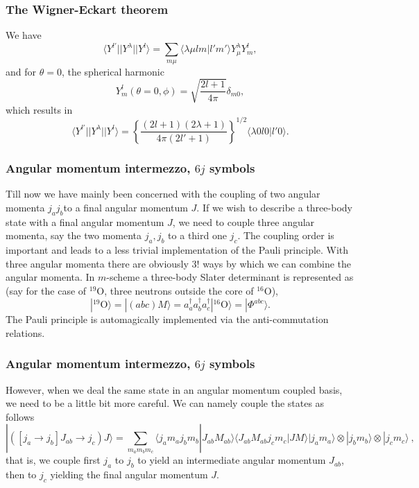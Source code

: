 \documentclass[compress]{beamer}
\begin{document}
\frame
{
\frametitle{The Wigner-Eckart theorem}
\begin{small}
{\scriptsize
We have 
\[
\langle Y^{l'}||Y^{\lambda}|| Y^{l}\rangle=\sum_{m\mu}\langle \lambda\mu lm|l'm'\rangle Y^{\lambda}_{\mu}Y^l_m,
\]
and for $\theta=0$, the spherical harmonic
\[
Y_m^l(\theta=0,\phi)=\sqrt{\frac{2l+1}{4\pi}}\delta_{m0}, 
\]
which results in 
\[
\langle Y^{l'}||Y^{\lambda}|| Y^{l}\rangle=\left\{\frac{(2l+1)(2\lambda+1)}{4\pi(2l'+1)}\right\}^{1/2}\langle \lambda0 l0|l'0\rangle.
\]
}
\end{small}

}





\frame
{
\frametitle{Angular momentum intermezzo, $6j$ symbols}
\begin{small}
{\scriptsize
Till now we have mainly been concerned with the coupling of two angular momenta $j_aj_b$to a final angular momentum $J$.
If we wish to describe a three-body state with a final angular momentum $J$, we need to couple three angular momenta, say 
the two momenta $j_a,j_b$ to a third one $j_c$. The coupling order is important and leads to a less trivial implementation of the 
Pauli principle. With three angular momenta there are obviously $3!$ ways by which we can combine the angular momenta. \newline
In $m$-scheme a three-body Slater determinant is represented as (say for the case of $^{19}$O, three neutrons outside the core of $^{16}$O),
\[
|^{19}\mathrm{O}\rangle =|(abc)M\rangle  = a^{\dagger}_aa^{\dagger}_ba^{\dagger}_c|^{16}\mathrm{O}\rangle=|\Phi^{abc}\rangle.
\]
The Pauli principle is automagically implemented via the anti-commutation relations. 
}
\end{small}
}


\frame
{
\frametitle{Angular momentum intermezzo, $6j$ symbols}
\begin{small}
{\scriptsize
However, when we deal the same state in an angular momentum coupled basis, we need to be a little bit more careful. We can namely couple the states
as follows
\[
| ([j_a\rightarrow j_b]J_{ab}\rightarrow j_c) J\rangle= \sum_{m_am_bm_c}\langle j_am_aj_bm_b|J_{ab}M_{ab}\rangle \langle J_{ab}M_{ab}j_cm_c|JM\rangle|j_am_a\rangle\otimes |j_bm_b\rangle \otimes |j_cm_c\rangle \ , \label{eq:fabc}
\]
that is, we couple first $j_a$ to $j_b$ to yield an intermediate angular momentum $J_{ab}$, then to $j_c$ yielding the final angular momentum $J$.
}
\end{small}
}
\end{document}
